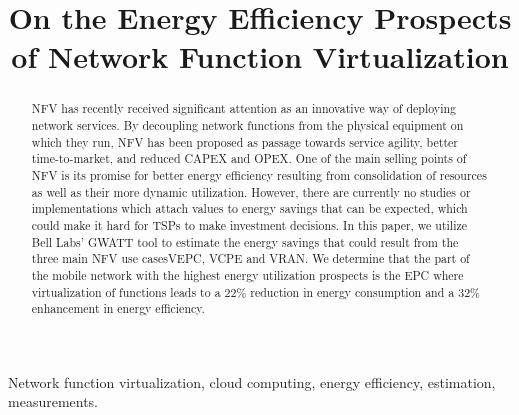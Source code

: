 \documentclass[conference]{IEEEtran}
\begin{document}
\title{On the Energy Efficiency Prospects of Network Function Virtualization}

\author{
}

\maketitle

\begin{abstract}
\ac{NFV} has recently received significant attention as an innovative way of deploying network services. By decoupling network functions from the physical equipment on which they run, \ac{NFV} has been proposed as passage towards service agility, better time-to-market, and reduced \ac{CAPEX} and \ac{OPEX}. One of the main selling points of \ac{NFV} is its promise for better energy efficiency resulting from consolidation of resources as well as their more dynamic utilization. However, there are currently no studies or implementations which attach values to energy savings that can be expected, which could make it hard for \acp{TSP} to make investment decisions. In this paper, we utilize Bell Labs' GWATT tool to estimate the energy savings that could result from the three main NFV use cases\ac{VEPC}, \ac{VCPE} and \ac{VRAN}. We determine that the part of the mobile network with the highest energy utilization prospects is the \ac{EPC} where virtualization of functions leads to a 22\% reduction in energy consumption and a 32\% enhancement in energy efficiency.
\end{abstract}

\begin{IEEEkeywords}
Network function virtualization, cloud computing, energy efficiency, estimation, measurements.
\end{IEEEkeywords}
\end{document}
